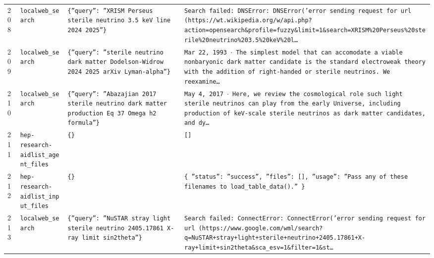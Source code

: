 \documentclass[11pt,a4paper]{article}
\begin{document}
\begin{longtable}{@{}p{}p{}p{}p{}@{}}
208 & \texttt{local}\newline\texttt{web\_\allowbreak{}search} & \texttt{\{''query'':\allowbreak{} ''XRISM Perseus sterile neutrino 3.5 keV line 2024 2025''\}\allowbreak{}} & \texttt{Search failed:\allowbreak{} DNSError:\allowbreak{} DNSError('error sending request for url (https:\allowbreak{}/\allowbreak{}/\allowbreak{}wt.wikipedia.org/\allowbreak{}w/\allowbreak{}api.php?action=\allowbreak{}opensearch\&profile=\allowbreak{}fuzzy\&limit=\allowbreak{}1\&search=\allowbreak{}XRISM\%20Perseus\%20sterile\%20neutrino\%203.5\%20keV\%20l\ldots{}\allowbreak{}} \\
209 & \texttt{local}\newline\texttt{web\_\allowbreak{}search} & \texttt{\{''query'':\allowbreak{} ''sterile neutrino dark matter Dodelson-Widrow 2024 2025 arXiv Lyman-alpha''\}\allowbreak{}} & \texttt{Mar 22,\allowbreak{} 1993 $\cdot$ The simplest model that can accomodate a viable nonbaryonic dark matter candidate is the standard electroweak theory with the addition of right-handed or sterile neutrinos. We reexamine\ldots{}\allowbreak{}} \\
210 & \texttt{local}\newline\texttt{web\_\allowbreak{}search} & \texttt{\{''query'':\allowbreak{} ''Abazajian 2017 sterile neutrino dark matter production Eq 37 Omega h2 formula''\}\allowbreak{}} & \texttt{May 4,\allowbreak{} 2017 $\cdot$ Here,\allowbreak{} we review the cosmological role such light sterile neutrinos can play from the early Universe,\allowbreak{} including production of keV-scale sterile neutrinos as dark matter candidates,\allowbreak{} and dy\ldots{}\allowbreak{}} \\
211 & \texttt{hep-research-aid}\newline\texttt{list\_\allowbreak{}agent\_\allowbreak{}files} & \texttt{\{\}\allowbreak{}} & \texttt{[]\allowbreak{}} \\
212 & \texttt{hep-research-aid}\newline\texttt{list\_\allowbreak{}input\_\allowbreak{}files} & \texttt{\{\}\allowbreak{}} & \texttt{\{   ''status'':\allowbreak{} ''success'',\allowbreak{}   ''files'':\allowbreak{} []\allowbreak{},\allowbreak{}   ''usage'':\allowbreak{} ''Pass any of these filenames to load\_\allowbreak{}table\_\allowbreak{}data()\allowbreak{}.'' \}\allowbreak{}} \\
213 & \texttt{local}\newline\texttt{web\_\allowbreak{}search} & \texttt{\{''query'':\allowbreak{} ''NuSTAR stray light sterile neutrino 2405.17861 X-ray limit sin2theta''\}\allowbreak{}} & \texttt{Search failed:\allowbreak{} ConnectError:\allowbreak{} ConnectError('error sending request for url (https:\allowbreak{}/\allowbreak{}/\allowbreak{}www.google.com/\allowbreak{}wml/\allowbreak{}search?q=\allowbreak{}NuSTAR+stray+light+sterile+neutrino+2405.17861+X-ray+limit+sin2theta\&sca\_\allowbreak{}esv=\allowbreak{}1\&filter=\allowbreak{}1\&st\ldots{}\allowbreak{}} \\

\end{longtable}
\end{document}
